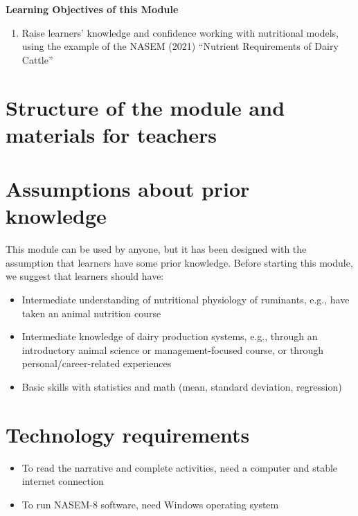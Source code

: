 \documentclass[
]{book}
\providecommand{\tightlist}{%
  \setlength{\itemsep}{0pt}\setlength{\parskip}{0pt}}
\begin{document}
\textbf{Learning Objectives of this Module}

\begin{enumerate}
\def\labelenumi{\arabic{enumi}.}
\tightlist
\item
  Raise learners' knowledge and confidence working with nutritional models, using the example of the NASEM (2021) ``Nutrient Requirements of Dairy Cattle''
\end{enumerate}

\hypertarget{structure-of-the-module-and-materials-for-teachers}{%
\section{Structure of the module and materials for teachers}\label{structure-of-the-module-and-materials-for-teachers}}

\hypertarget{assumptions-about-prior-knowledge}{%
\section{Assumptions about prior knowledge}\label{assumptions-about-prior-knowledge}}

This module can be used by anyone, but it has been designed with the assumption that learners have some prior knowledge. Before starting this module, we suggest that learners should have:

\begin{itemize}
\item
  Intermediate understanding of nutritional physiology of ruminants, e.g., have taken an animal nutrition course
\item
  Intermediate knowledge of dairy production systems, e.g., through an introductory animal science or management-focused course, or through personal/career-related experiences
\item
  Basic skills with statistics and math (mean, standard deviation, regression)
\end{itemize}

\hypertarget{technology-requirements}{%
\section{Technology requirements}\label{technology-requirements}}

\begin{itemize}
\tightlist
\item
  To read the narrative and complete activities, need a computer and stable internet connection
\item
  To run NASEM-8 software, need Windows operating system
\end{itemize}
\end{document}
